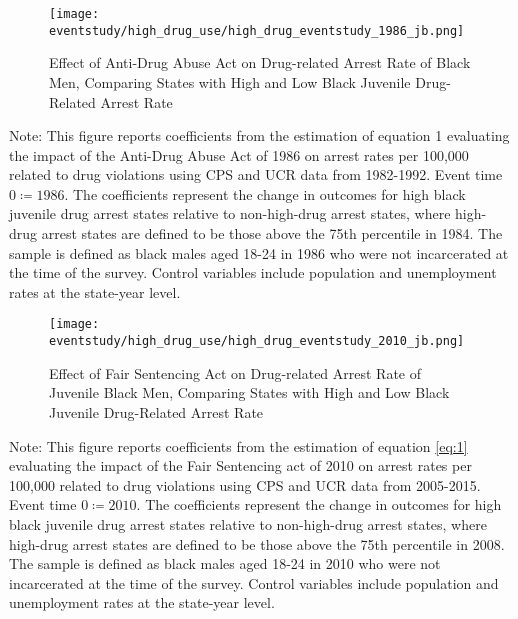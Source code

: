 \clearpage

  \begin{figure}[h]
    \caption{Effect of Anti-Drug Abuse Act on Drug-related Arrest Rate of Black Men, Comparing States with High and Low Black Juvenile Drug-Related Arrest Rate}
    \centering
    \texttt{[image: eventstudy/high\_drug\_use/high\_drug\_eventstudy\_1986\_jb.png]}
    \label{fig:jb_es_1986}
  \end{figure}

  \begin{footnotesize}
    \noindent Note: This figure reports coefficients from the estimation of equation 1 evaluating the impact of the Anti-Drug Abuse Act of 1986 on arrest rates per 100,000 related to drug violations using CPS and UCR data from 1982-1992. Event time $0 \coloneqq 1986$. The coefficients represent the change in outcomes for high black juvenile drug arrest states relative to non-high-drug arrest states, where high-drug arrest states are defined to be those above the 75th percentile in 1984. The sample is defined as black males aged 18-24 in 1986 who were not incarcerated at the time of the survey. Control variables include population and unemployment rates at the state-year level. 
  \end{footnotesize}

\clearpage

\begin{figure}[h]
    \caption{Effect of Fair Sentencing Act on Drug-related Arrest Rate of Juvenile Black Men, Comparing States with High and Low Black Juvenile Drug-Related Arrest Rate}
    \centering
    \texttt{[image: eventstudy/high\_drug\_use/high\_drug\_eventstudy\_2010\_jb.png]}
    \label{fig:jb_es_2010}
  \end{figure}

  \begin{footnotesize}
    \noindent Note: This figure reports coefficients from the estimation of equation \ref{eq:1} evaluating the impact of the Fair Sentencing act of 2010 on arrest rates per 100,000 related to drug violations using CPS and UCR data from 2005-2015. Event time $0 \coloneqq 2010$. The coefficients represent the change in outcomes for high black juvenile drug arrest states relative to non-high-drug arrest states, where high-drug arrest states are defined to be those above the 75th percentile in 2008. The sample is defined as black males aged 18-24 in 2010 who were not incarcerated at the time of the survey. Control variables include population and unemployment rates at the state-year level. 
  \end{footnotesize}

